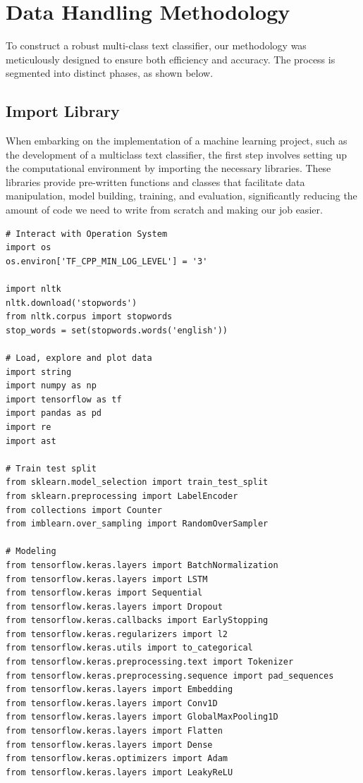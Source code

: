 \section{Data Handling Methodology}

To construct a robust multi-class text classifier, our methodology was meticulously designed to ensure both efficiency and accuracy. The process is segmented into distinct phases, as shown below.

\subsection{Import Library}
When embarking on the implementation of a machine learning project, such as the development of a multiclass text classifier, the first step involves setting up the computational environment by importing the necessary libraries. These libraries provide pre-written functions and classes that facilitate data manipulation, model building, training, and evaluation, significantly reducing the amount of code we need to write from scratch and making our job easier.\\

\begin{lstlisting}
# Interact with Operation System
import os
os.environ['TF_CPP_MIN_LOG_LEVEL'] = '3'

import nltk
nltk.download('stopwords')
from nltk.corpus import stopwords
stop_words = set(stopwords.words('english'))

# Load, explore and plot data
import string
import numpy as np
import tensorflow as tf
import pandas as pd
import re
import ast

# Train test split
from sklearn.model_selection import train_test_split
from sklearn.preprocessing import LabelEncoder
from collections import Counter
from imblearn.over_sampling import RandomOverSampler

# Modeling
from tensorflow.keras.layers import BatchNormalization
from tensorflow.keras.layers import LSTM
from tensorflow.keras import Sequential
from tensorflow.keras.layers import Dropout
from tensorflow.keras.callbacks import EarlyStopping
from tensorflow.keras.regularizers import l2
from tensorflow.keras.utils import to_categorical
from tensorflow.keras.preprocessing.text import Tokenizer
from tensorflow.keras.preprocessing.sequence import pad_sequences
from tensorflow.keras.layers import Embedding
from tensorflow.keras.layers import Conv1D
from tensorflow.keras.layers import GlobalMaxPooling1D
from tensorflow.keras.layers import Flatten
from tensorflow.keras.layers import Dense
from tensorflow.keras.optimizers import Adam
from tensorflow.keras.layers import LeakyReLU
\end{lstlisting}


